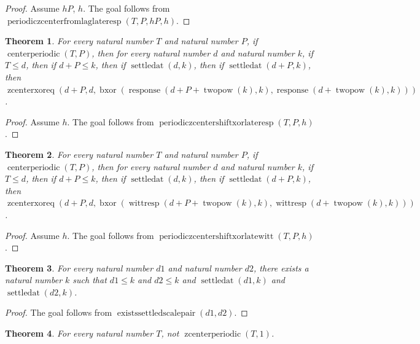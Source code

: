 \documentclass[11pt]{article}
\newtheorem{theorem}{Theorem}[section]
\theoremstyle{definition}
\begin{document}
\begin{proof}
Assume \(hP\), \(h\).
The goal follows from \(\operatorname{periodiczcenterfromlaglateresp}(T, P, hP, h)\).
\end{proof}
\begin{theorem}
\label{ll:paper:periodic-zcenter-shift-xor-late-response}
For every natural number \(T\) and natural number \(P\), if \(\operatorname{centerperiodic}(T, P)\), then for every natural number \(d\) and natural number \(k\), if \(T \le d\), then if \(d + P \le k\), then if \(\operatorname{settledat}(d, k)\), then if \(\operatorname{settledat}(d + P, k)\), then \(\operatorname{zcenterxoreq}(d + P, d, \operatorname{bxor}(\operatorname{response}(d + P + \operatorname{twopow}(k), k), \operatorname{response}(d + \operatorname{twopow}(k), k)))\).
\end{theorem}
\begin{proof}
Assume \(h\).
The goal follows from \(\operatorname{periodiczcentershiftxorlateresp}(T, P, h)\).
\end{proof}
\begin{theorem}
\label{ll:paper:periodic-zcenter-shift-xor-late-witt}
For every natural number \(T\) and natural number \(P\), if \(\operatorname{centerperiodic}(T, P)\), then for every natural number \(d\) and natural number \(k\), if \(T \le d\), then if \(d + P \le k\), then if \(\operatorname{settledat}(d, k)\), then if \(\operatorname{settledat}(d + P, k)\), then \(\operatorname{zcenterxoreq}(d + P, d, \operatorname{bxor}(\operatorname{wittresp}(d + P + \operatorname{twopow}(k), k), \operatorname{wittresp}(d + \operatorname{twopow}(k), k)))\).
\end{theorem}
\begin{proof}
Assume \(h\).
The goal follows from \(\operatorname{periodiczcentershiftxorlatewitt}(T, P, h)\).
\end{proof}
\begin{theorem}
\label{ll:paper:exists-settled-scale-pair}
For every natural number \(d1\) and natural number \(d2\), there exists a natural number \(k\) such that \(d1 \le k\) and \(d2 \le k\) and \(\operatorname{settledat}(d1, k)\) and \(\operatorname{settledat}(d2, k)\).
\end{theorem}
\begin{proof}
The goal follows from \(\operatorname{existssettledscalepair}(d1, d2)\).
\end{proof}
\begin{theorem}
\label{ll:paper:zcenter-not-periodic-one}
For every natural number \(T\), not \(\operatorname{zcenterperiodic}(T, 1)\).
\end{theorem}
\end{document}
